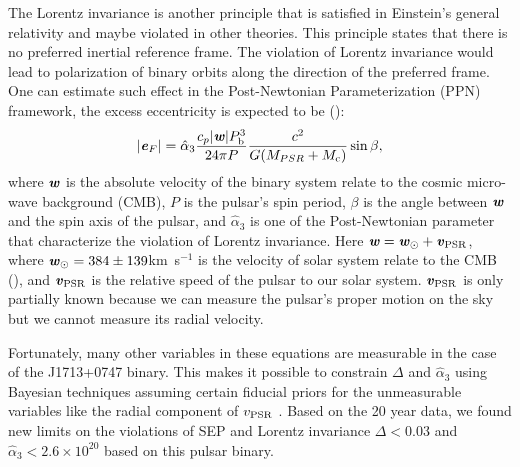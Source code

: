 The Lorentz invariance is another principle that is satisfied in Einstein's
general relativity and maybe violated in other theories. This principle
states that there is no preferred inertial reference frame. The violation of
Lorentz invariance would lead to polarization of binary orbits along the
direction of the preferred frame.
One can estimate such effect in the Post-Newtonian Parameterization
(PPN) framework, the excess eccentricity is expected to be (\citealt{bd97}):
\begin{equation}
|\textbf{\textit{e}}_F| = \hat{\alpha}_3 \frac{c_p|\textbf{\textit{w}}|P_{\rm b}^3}{24\pi P}
\frac{c^2}{G (M_{PSR}+M_{\rm c})}\sin \beta,
\end{equation}
where $\textbf{\textit{w}}$ is the absolute velocity of the binary system
relate to the cosmic micro-wave background (CMB), $P$ is the pulsar's spin period, $\beta$ is the
angle between $\textbf{\textit{w}}$ and the spin axis of the pulsar, and
$\hat{\alpha}_3$ is one of the Post-Newtonian parameter that characterize the
violation of Lorentz invariance. 
Here $\textbf{\textit{w}} = \textbf{\textit{w}}_{\odot} + \textbf{\textit{v}}_{\rm PSR}$, where
$\textbf{\textit{w}}_{\odot}=384\pm139$km~s$^{-1}$ is the velocity of solar system relate to the CMB (\citealt{aaa+13}),
and $\textbf{\textit{v}}_{\rm PSR}$ is the relative speed of the pulsar to our solar system. $\textbf{\textit{v}}_{\rm PSR}$ is only partially known because we can measure the pulsar's
proper motion on the sky but we cannot measure its radial velocity.

Fortunately, many other variables in these equations are measurable in the
case of the J1713+0747 binary. This makes it possible to constrain $\Delta$
and $\hat{\alpha}_3$ using Bayesian techniques assuming certain fiducial
priors for the unmeasurable variables like the radial component of
$v_{\rm PSR}$ \citep{sns+05, sfl+05, gsf+11}. Based on the 20 year 
data, we found new
limits on the violations of SEP and Lorentz invariance $\Delta < 0.03$ and
$\hat{\alpha}_3<2.6\times10^{20}$ based on this pulsar binary.


